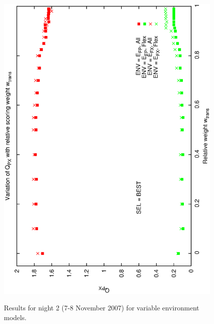 \begin{figure}[h]
\begin{center}
{    \includegraphics[scale=0.25, angle=-90]{figures/cs1_dw1_px_c.eps}
    \label{fig:cs1_dw1_px_c}
  }
 \caption{Results for night 2 (7-8 November 2007) for variable environment models.}
\end{center}
\end{figure}

